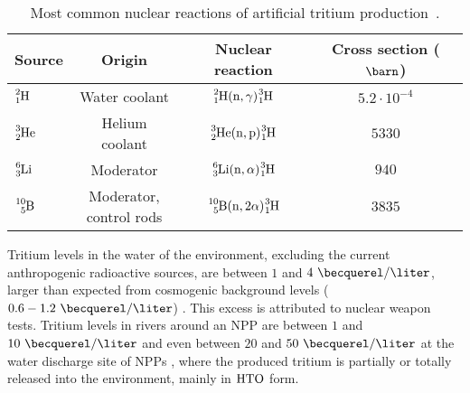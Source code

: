 \begin{table}[htbp]
\centering{}%
\begin{tabular}{lccc}
\toprule 
Source & Origin & Nuclear reaction & Cross section ($\barn$)\tabularnewline
\midrule
\midrule 
$\ce{^{2}_{1}H}$ & Water coolant & $\ce{^{2}_{1}H}(\ce{n},\gamma)\ce{^{3}_{1}H}$ & $5.2 \cdot{} 10^{-4}$ \tabularnewline
$\ce{^{3}_{2}He}$ & Helium coolant & $\ce{^{3}_{2}He}(\ce{n},\ce{p})\ce{^{3}_{1}H}$ & $5330$ \tabularnewline
\vspace{0.1cm}$\ce{^{6}_{3}Li}$ & Moderator & $\ce{^{6}_{3}Li}(\ce{n},\alpha)\ce{^{3}_{1}H}$ & $940$ \tabularnewline
$\ce{^{10}_{5}B}$ & \parbox{8em}{\centering Moderator,\\ control rods} & $\ce{^{10}_{5}B}(\ce{n},2\alpha)\ce{^{3}_{1}H}$ & $3835$ \tabularnewline 
\bottomrule
\end{tabular}
\caption{Most common nuclear reactions of artificial tritium production~\cite{CommonEmissionTritium}.}
\label{tab:NuclearReactionsTritiumProduction}
\end{table}

Tritium levels in the water of the environment, excluding the current anthropogenic radioactive sources, are between $1$ and $4~\becquerel/\liter$, larger than expected from cosmogenic background levels ($0.6-1.2~\becquerel/\liter$) \cite{FranceTritiumEnvironment}. This excess is attributed to nuclear weapon tests. Tritium levels in rivers around an NPP are between $1$ and $10~\becquerel/\liter$ and even between $20$ and $50~\becquerel/\liter$ at the water discharge site of NPPs \cite{FranceTritiumEnvironment}, where the produced tritium is partially or totally released into the environment, mainly in $\ce{HTO}$ form.


